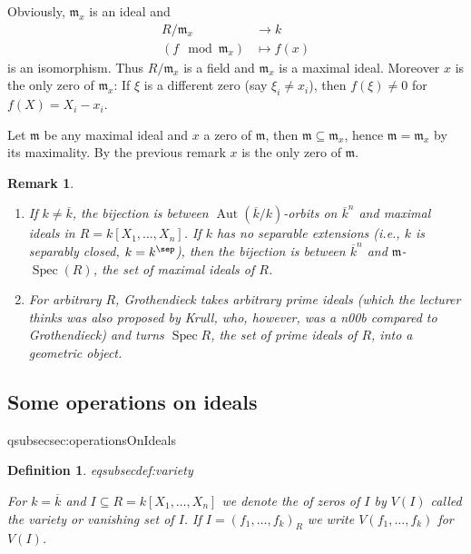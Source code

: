 \documentclass[DIV=14,parskip=full,pointednumbers]{scrartcl}
\newenvironment{alphanumerate}{\begin{enumerate}[label={$(\alph*)$},ref=\curthm]}{\end{enumerate}}
\theoremstyle{cthm}
\theoremstyle{cvarthm}
\renewenvironment{proof}[1][\proofname]
{\pushQED{\qed}\topsep0pt \partopsep0pt\trivlist\item[\hskip\labelsep\itshape #1.] }{\popQED\endtrivlist\addvspace{6pt plus 6pt}}
\theoremstyle{cdef}
\newtheorem{defi}{Definition}[subsection]
\newtheorem{rem}{Remark}[subsection]
\newcommand{\lbl}[1]{
	\label{#1}
	\ifmmode
	\expandafter\xdef\csname eqsubsec#1\endcsname{\thesubsection}
	\fi
}
\newcommand{\mm}{\mathfrak{m}}
\newcommand{\Aut}{\operatorname{Aut}}
\newcommand{\longto}{\longrightarrow}
\begin{document}
	\begin{proof}
		Obviously, $\mm_x$ is an ideal and
		\begin{align*}
		R/\mm_x &\longto k\\
		(f\mod \mm_x) &\longmapsto f(x)
		\end{align*}
		is an isomorphism. Thus $R/\mm_x$ is a field and $\mm_x$ is a maximal ideal. Moreover $x$ is the only zero of $\mm_x$: If $\xi$ is a different zero (say $\xi_i\neq x_i$), then $f(\xi)\neq 0$ for $f(X) = X_i-x_i$.
		
		Let $\mm$ be any maximal ideal and $x$ a zero of $\mm$, then $\mm\subseteq\mm_x$, hence $\mm=\mm_x$ by its maximality. By the previous remark $x$ is the only zero of $\mm$.
	\end{proof}
	\begin{rem}
		\begin{alphanumerate}
			\item If $k\neq\overline{k}$, the bijection is between $\Aut(\overline{k}/k)$-orbits on $\overline{k}^n$ and maximal ideals in $R=k[X_1,\ldots,X_n]$. If $k$ has no separable extensions (i.e., $k$ is \emph{separably closed}, $k=k^{\sep}$), then the bijection is between $\overline{k}^n$ and $\mm$-$\operatorname{Spec}(R)$, the set of maximal ideals of $R$.
			\item For arbitrary $R$, Grothendieck takes arbitrary prime ideals (which the lecturer thinks was also proposed by Krull, who, however, was a \emph{n00b} compared to Grothendieck) and turns $\operatorname{Spec} R$, the set of prime ideals of $R$, into a geometric object.
		\end{alphanumerate}
		
	\end{rem}
	
	
\subsection{Some operations on ideals}\lbl{sec:operationsOnIdeals}
	\begin{defi}\lbl{def:variety}
		For $k=\overline{k}$ and $I\subseteq R = k[X_1,\ldots,X_n]$ we denote the of zeros of $I$ by $V(I)$ called the \emph{variety} or \emph{vanishing set} of $I$. If $I=(f_1,\ldots,f_k)_R$ we write $V(f_1,\ldots,f_k)$ for $V(I)$.
	\end{defi}
	
\end{document}
